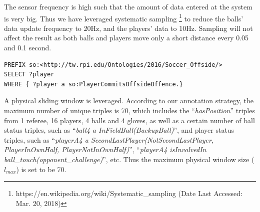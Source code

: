 The sensor frequency is high such that the amount of data entered at the system is very big. 
Thus we have leveraged systematic sampling \footnote{https://en.wikipedia.org/wiki/Systematic\_sampling (Date Last Accessed: Mar. 20, 2018)} to reduce the balls' data update frequency to 20Hz, and the players' data to 10Hz.
Sampling will not affect the result as both balls and players move only a short distance every 0.05 and 0.1 second.

\begin{lstlisting}[caption={\textbf{Offside Offence Detection Query}},basicstyle=\small]
PREFIX so:<http://tw.rpi.edu/Ontologies/2016/Soccer_Offside/>
SELECT ?player 
WHERE { ?player a so:PlayerCommitsOffsideOffence.}
\end{lstlisting}

A physical sliding window is leveraged.
According to our annotation strategy, the maximum number of unique triples is 70, which includes the ``\textit{hasPosition}'' triples from 1 referee, 16 players, 4 balls and 4 gloves, as well as a certain number of ball status triples, such as ``\textit{ball4 a InFieldBall(BackupBall)}'', and player status triples, such as ``\textit{playerA4 a SecondLastPlayer(NotSecondLastPlayer, PlayerInOwnHalf, PlayerNotInOwnHalf)}'', ``\textit{playerA4 isInvolvedIn ball\_touch(opponent\_challenge)}'', etc. 
Thus the maximum physical window size ($l_{max}$) is set to be 70.

